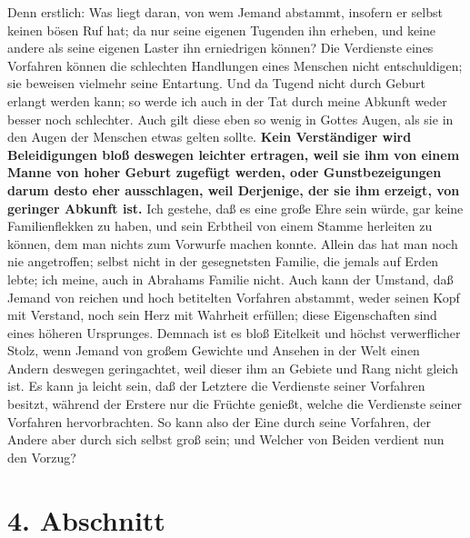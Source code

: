 Denn erstlich: Was liegt daran, von wem Jemand
abstammt, insofern er selbst
keinen bösen Ruf hat; da nur seine eigenen Tugenden ihn erheben, und keine
andere als seine eigenen Laster ihn erniedrigen können? Die Verdienste eines
Vorfahren können die schlechten Handlungen eines Menschen nicht
entschuldigen;
sie beweisen vielmehr seine Entartung. Und da Tugend nicht durch Geburt erlangt
werden kann; so werde ich auch in der Tat durch meine Abkunft weder besser noch
schlechter. Auch gilt diese eben so wenig in Gottes Augen, als sie in den Augen
der Menschen etwas gelten sollte. \label{ref:11_03_beleidigung}
\textbf{Kein Verständiger wird Beleidigungen bloß
deswegen leichter ertragen, weil sie ihm von einem Manne von hoher Geburt
zugefügt werden, oder Gunstbezeigungen darum desto eher ausschlagen, weil
Derjenige, der sie ihm erzeigt, von geringer Abkunft ist.} Ich gestehe, daß es
eine große Ehre sein würde, gar keine Familienflekken zu haben, und sein
Erbtheil von einem Stamme herleiten zu können, dem man nichts zum Vorwurfe
machen konnte. Allein das hat man noch nie angetroffen; selbst nicht in der
gesegnetsten Familie, die jemals auf Erden lebte; ich meine, auch in
Abrahams
Familie nicht. Auch kann der Umstand, daß Jemand von reichen und hoch betitelten
Vorfahren abstammt, weder seinen Kopf mit Verstand, noch sein Herz mit Wahrheit
erfüllen; diese Eigenschaften sind eines höheren Ursprunges. Demnach ist es bloß
Eitelkeit und höchst verwerflicher Stolz, wenn Jemand von großem
Gewichte und
Ansehen in der Welt einen Andern deswegen geringachtet, weil dieser ihm an
Gebiete und Rang nicht gleich ist. Es kann ja leicht sein, daß der Letztere die
Verdienste seiner Vorfahren besitzt, während der Erstere nur die Früchte
genießt, welche die Verdienste seiner Vorfahren hervorbrachten. So kann also der
Eine durch seine Vorfahren, der Andere aber durch sich selbst groß sein; und
Welcher von Beiden verdient nun den Vorzug?

\section{4. Abschnitt} \label{kap11_ab4}

